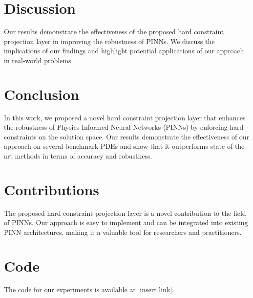 \documentclass{article}
\begin{document}
\section*{Discussion}

Our results demonstrate the effectiveness of the proposed hard constraint projection layer in improving the robustness of PINNs. We discuss the implications of our findings and highlight potential applications of our approach in real-world problems.

\section*{Conclusion}

In this work, we proposed a novel hard constraint projection layer that enhances the robustness of Physics-Informed Neural Networks (PINNs) by enforcing hard constraints on the solution space. Our results demonstrate the effectiveness of our approach on several benchmark PDEs and show that it outperforms state-of-the-art methods in terms of accuracy and robustness.

\section*{Contributions}

The proposed hard constraint projection layer is a novel contribution to the field of PINNs. Our approach is easy to implement and can be integrated into existing PINN architectures, making it a valuable tool for researchers and practitioners.

\section*{Code}

The code for our experiments is available at [insert link].
\end{document}
